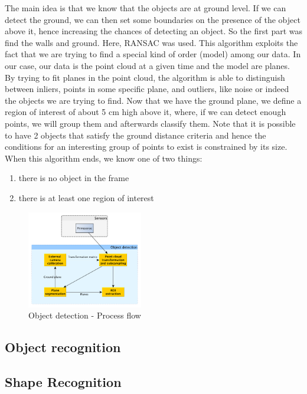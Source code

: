 The main idea is that we know that the objects are at ground level.
If we can detect the ground, we can then set some boundaries on the presence of the object above it, hence increasing the chances of detecting an object.
So the first part was find the walls and ground. Here, RANSAC was used. This algorithm exploits the fact that we are trying to find a special kind of order (model) among our data.
In our case, our data is the point cloud at a given time and the model are planes. 
By trying to fit planes in the point cloud, the algorithm is able to distinguish between inliers, points in some specific plane, and outliers, like noise or indeed the objects we are trying to find.
Now that we have the ground plane, we define a region of interest of about 5 cm high above it, where, if we can detect enough points, we will group them and afterwards classify them.
Note that it is possible to have 2 objects that satisfy the ground distance criteria and hence the conditions for an interesting group of points to exist is constrained by its size.
When this algorithm ends, we know one of two things:
\begin{enumerate}
\item there is no object in the frame
\item there is at least one region of interest
\end{enumerate}

\begin{figure}
\begin{center}
\includegraphics[width=0.45\textwidth]{figures/arch_vision_obj_det.pdf}
\end{center}
\caption{Object detection - Process flow}
\label{fig:vision:obj_det}
\end{figure}
 
\subsection{Object recognition} 
 
\subsection{Shape Recognition}

